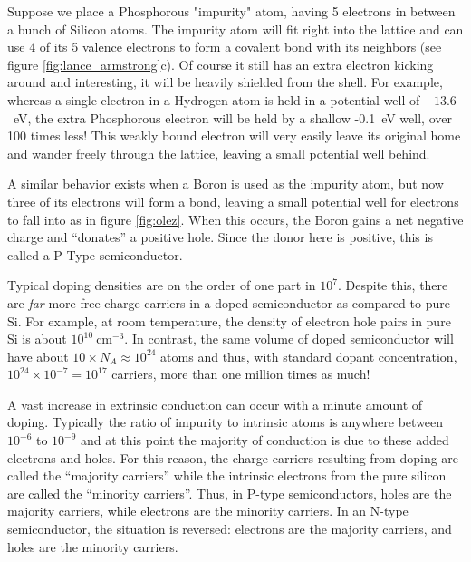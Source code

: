 \documentclass{tufte-book}
\begin{document}
Suppose we place a Phosphorous "impurity" atom, having 5 electrons in between a bunch of Silicon atoms. The impurity atom will fit right into the lattice and can use 4 of its 5 valence electrons to form a covalent bond with its neighbors (see figure \ref{fig:lance_armstrong}c). Of course it still has an extra electron kicking around and interesting, it will be heavily shielded from the shell. For example, whereas a single electron in a Hydrogen atom is held in a potential well of $-13.6$~eV, the extra Phosphorous electron will be held by a shallow -0.1~eV well, over 100 times less! This weakly bound electron will very easily leave its original home and wander freely through the lattice, leaving a small potential well behind.

A similar behavior exists when a Boron is used as the impurity atom, but now three of its electrons will form a bond, leaving a small potential well for electrons to fall into as in figure \ref{fig:olez}. When this occurs, the Boron gains a net negative charge and ``donates'' a positive hole. Since the donor here is positive, this is called a P-Type semiconductor.

Typical doping densities are on the order of one part in $10^7$. Despite this, there are \textit{far} more free charge carriers in a doped semiconductor as compared to pure Si. For example, at room temperature, the density of electron hole pairs in pure Si is about $10^{10}~\text{cm}^{-3}$. In contrast, the same volume of doped semiconductor will have about $10\times N_A \approx 10^{24}$ atoms and thus, with standard dopant concentration, $10^{24}\times10^{-7} = 10^{17}$ carriers, more than one million times as much!

A vast increase in extrinsic conduction can occur with a minute amount of doping. Typically the ratio of impurity to intrinsic atoms is anywhere between $10^{-6}$ to $10^{-9}$ and at this point the majority of conduction is due to these added electrons and holes. For this reason, the charge carriers resulting from doping are called the ``majority carriers'' while the intrinsic electrons from the pure silicon are called the ``minority carriers''. Thus, in P-type semiconductors, holes are the majority carriers, while electrons are the minority carriers. In an N-type semiconductor, the situation is reversed: electrons are the majority carriers, and holes are the minority carriers.
\end{document}
